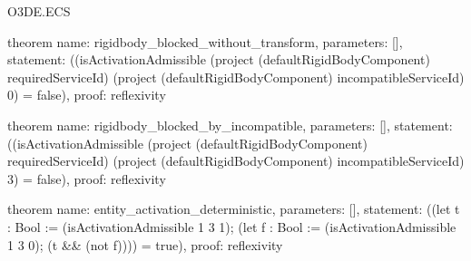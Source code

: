 \begin{lexlean}{O3DE.ECS}
\begin{semanticmodule}
theorem{
  name: rigidbody_blocked_without_transform,
  parameters: [],
  statement: ((isActivationAdmissible (project (defaultRigidBodyComponent) requiredServiceId) (project (defaultRigidBodyComponent) incompatibleServiceId) 0) = false),
  proof: reflexivity{}
}

theorem{
  name: rigidbody_blocked_by_incompatible,
  parameters: [],
  statement: ((isActivationAdmissible (project (defaultRigidBodyComponent) requiredServiceId) (project (defaultRigidBodyComponent) incompatibleServiceId) 3) = false),
  proof: reflexivity{}
}

theorem{
  name: entity_activation_deterministic,
  parameters: [],
  statement: ((let t : Bool := (isActivationAdmissible 1 3 1); (let f : Bool := (isActivationAdmissible 1 3 0); (t && (not f)))) = true),
  proof: reflexivity{}
}
\end{semanticmodule}
\end{lexlean}
